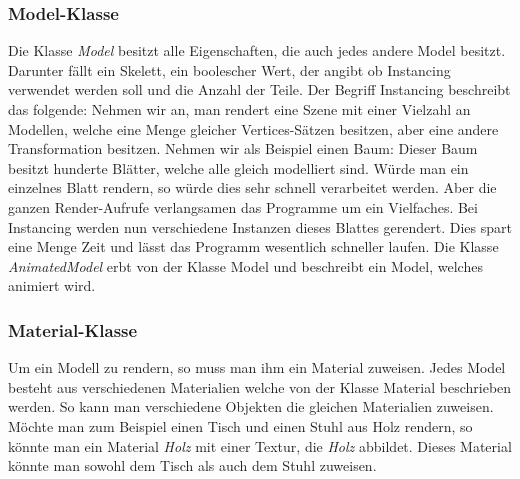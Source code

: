 \subsubsection{Model-Klasse}
\label{Modelclass}
Die Klasse \textit{Model} besitzt alle Eigenschaften, die auch jedes andere Model besitzt. Darunter fällt ein Skelett, ein boolescher Wert, der angibt ob Instancing verwendet werden soll und die Anzahl der Teile. 
Der Begriff Instancing beschreibt das folgende:
Nehmen wir an, man rendert eine Szene mit einer Vielzahl an Modellen, welche eine Menge gleicher Vertices-Sätzen besitzen, aber eine andere Transformation besitzen.
Nehmen wir als Beispiel einen Baum:
Dieser Baum besitzt hunderte Blätter, welche alle gleich modelliert sind. Würde man ein einzelnes Blatt rendern, so würde dies sehr schnell verarbeitet werden. Aber die ganzen Render-Aufrufe verlangsamen das Programme um ein Vielfaches. 
Bei Instancing werden nun verschiedene Instanzen dieses Blattes gerendert. Dies spart eine Menge Zeit und lässt das Programm wesentlich schneller laufen.
Die Klasse \textit{AnimatedModel} erbt von der Klasse Model und beschreibt ein Model, welches animiert wird.

\subsubsection{Material-Klasse}
Um ein Modell zu rendern, so muss man ihm ein Material zuweisen. Jedes Model besteht aus verschiedenen Materialien welche von der Klasse Material beschrieben werden.
So kann man verschiedene Objekten die gleichen Materialien zuweisen. Möchte man zum Beispiel einen Tisch und einen Stuhl aus Holz rendern, so könnte man ein Material \textit{Holz} mit einer Textur, die \textit{Holz} abbildet. Dieses Material könnte man sowohl dem Tisch als auch dem Stuhl zuweisen.



